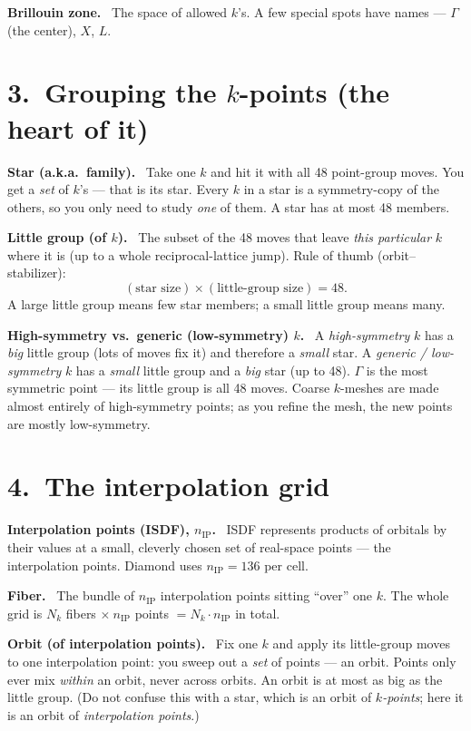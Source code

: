 \documentclass[11pt]{article}
\newcommand{\term}[1]{\medskip\noindent\textbf{#1.}\ }
\begin{document}
\term{Brillouin zone} The space of allowed $k$'s. A few special spots have names --- $\Gamma$ (the
center), $X$, $L$.

\section*{3.\ Grouping the $k$-points (the heart of it)}

\term{Star (a.k.a.\ family)} Take one $k$ and hit it with all 48 point-group moves. You get a
\emph{set} of $k$'s --- that is its star. Every $k$ in a star is a symmetry-copy of the others, so you
only need to study \emph{one} of them. A star has at most 48 members.

\term{Little group (of $k$)} The subset of the 48 moves that leave \emph{this particular} $k$ where it
is (up to a whole reciprocal-lattice jump). Rule of thumb (orbit--stabilizer):
\[
   (\text{star size})\times(\text{little-group size}) = 48 .
\]
A large little group means few star members; a small little group means many.

\term{High-symmetry vs.\ generic (low-symmetry) $k$} A \emph{high-symmetry} $k$ has a \emph{big} little
group (lots of moves fix it) and therefore a \emph{small} star. A \emph{generic / low-symmetry} $k$ has
a \emph{small} little group and a \emph{big} star (up to 48). $\Gamma$ is the most symmetric point ---
its little group is all 48 moves. Coarse $k$-meshes are made almost entirely of high-symmetry points;
as you refine the mesh, the new points are mostly low-symmetry.

\section*{4.\ The interpolation grid}

\term{Interpolation points (ISDF), $n_{\mathrm{IP}}$} ISDF represents products of orbitals by their
values at a small, cleverly chosen set of real-space points --- the interpolation points. Diamond uses
$n_{\mathrm{IP}}=136$ per cell.

\term{Fiber} The bundle of $n_{\mathrm{IP}}$ interpolation points sitting ``over'' one $k$. The whole
grid is $N_k$ fibers $\times\ n_{\mathrm{IP}}$ points $=N_k\cdot n_{\mathrm{IP}}$ in total.

\term{Orbit (of interpolation points)} Fix one $k$ and apply its little-group moves to one
interpolation point: you sweep out a \emph{set} of points --- an orbit. Points only ever mix
\emph{within} an orbit, never across orbits. An orbit is at most as big as the little group. (Do not
confuse this with a star, which is an orbit of \emph{$k$-points}; here it is an orbit of
\emph{interpolation points}.)
\end{document}
